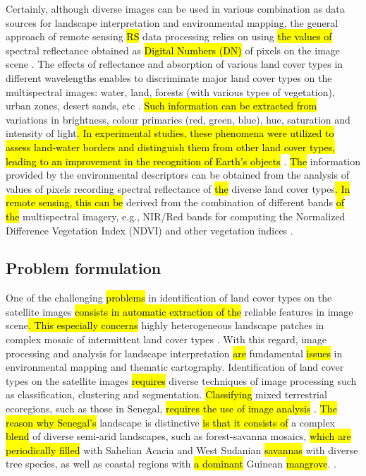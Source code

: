 \documentclass[earth,article,submit,pdftex,moreauthors]{Definitions/mdpi}
\begin{document}
Certainly, although diverse images can be used in various combination as data sources for landscape interpretation and environmental mapping, the general approach of remote sensing \hl{RS} data processing relies on using \hl{the values of} spectral reflectance obtained as \hl{Digital Numbers (DN)} of pixels on the image scene \cite{ACKER2014}. The effects of reflectance and absorption of various land cover types in different wavelengths\hl{ }enables to discriminate major land cover types on the multispectral images: water, land, forests (with various types of vegetation), urban zones, desert sands, etc \cite{rs12101634}. \hl{Such information can be extracted from}  variations in brightness, colour primaries (red, green, blue), hue, saturation and intensity of light\hl{. In experimental studies, these phenomena were utilized to assess land-water borders and distinguish them from other land cover types, leading to an improvement in the recognition of Earth's objects} \cite{rs13132454}. \hl{The} information\hl{ }provided by the environmental descriptors\hl{ }can be obtained from the analysis of values of pixels recording spectral reflectance of \hl{the} diverse land cover types\hl{. In remote sensing, this can be} derived from the combination of different bands \hl{of the} multispectral imagery, e.g., NIR/Red bands for computing the Normalized Difference Vegetation Index (NDVI) and other vegetation indices \cite{CRIPPEN199071,LI2004463,jmse11040871,RUAN2022157075}.

\subsection{Problem formulation}

One of the challenging \hl{problems} in identification of land cover types on the satellite images \hl{consists in automatic extraction of the} reliable features in image scene\hl{. This especially concerns }highly heterogeneous landscape patches in complex mosaic of intermittent land cover types \cite{CAMPOS2018211,SYIFA2020919}. With this regard, image processing and analysis for landscape interpretation \hl{are} fundamental \hl{issues} in environmental mapping and thematic cartography. Identification of land cover types on the satellite images \hl{requires} diverse techniques of image processing such as classification, clustering and segmentation. \hl{Classifying} mixed terrestrial ecoregions, such as those in Senegal, \hl{requires the use of image analysis} \cite{BUDDE2004481}. \hl{The reason why Senegal's} landscape is distinctive \hl{is that it consists of} a complex \hl{blend} of diverse semi-arid landscapes, such as forest-savanna mosaics, \hl{which are periodically filled} with Sahelian Acacia and West Sudanian \hl{savannas} with diverse tree species, as well as coastal regions with \hl{a dominant} Guinean \hl{mangrove}.
\cite{TAPPAN2004427,DEANS2003253}.
\end{document}
